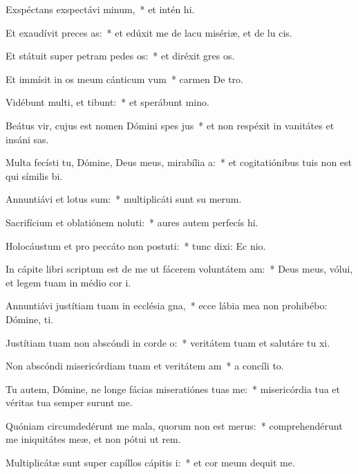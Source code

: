 \item Exspéctans exspectávi minum,~* et intén hi.
\item Et exaudívit preces as:~* et edúxit me de lacu misériæ, et de lu cis.
\item Et státuit super petram pedes os:~* et diréxit gres os.
\item Et immísit in os meum cánticum vum~* carmen De tro.
\item Vidébunt multi, et tibunt:~* et sperábunt  mino.
\item Beátus vir, cujus est nomen Dómini spes jus~* et non respéxit in vanitátes et insáni sas.
\item Multa fecísti tu, Dómine, Deus meus, mirabília a:~* et cogitatiónibus tuis non est qui símilis  bi.
\item Annuntiávi et lotus sum:~* multiplicáti sunt su merum.
\item Sacrifícium et oblatiónem noluti:~* aures autem perfecís hi.
\item Holocáustum et pro peccáto non postuti:~* tunc dixi: Ec nio.
\item In cápite libri scriptum est de me ut fácerem voluntátem am:~* Deus meus, vólui, et legem tuam in médio cor i.
\item Annuntiávi justítiam tuam in ecclésia gna,~* ecce lábia mea non prohibébo: Dómine,  ti.
\item Justítiam tuam non abscóndi in corde o:~* veritátem tuam et salutáre tu xi.
\item Non abscóndi misericórdiam tuam et veritátem am~* a concíli to.
\item Tu autem, Dómine, ne longe fácias miseratiónes tuas  me:~* misericórdia tua et véritas tua semper surunt me.
\item Quóniam circumdedérunt me mala, quorum non est merus:~* comprehendérunt me iniquitátes meæ, et non pótui ut rem.
\item Multiplicátæ sunt super capíllos cápitis i:~* et cor meum dequit me.

